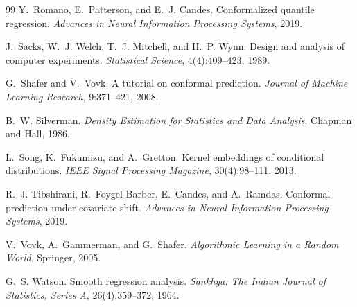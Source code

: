 \documentclass[11pt]{article}
\begin{document}
\begin{thebibliography}{99}
Y.~Romano, E.~Patterson, and E.~J. Candes.
\newblock Conformalized quantile regression.
\newblock \emph{Advances in Neural Information Processing Systems}, 2019.

J.~Sacks, W.~J. Welch, T.~J. Mitchell, and H.~P. Wynn.
\newblock Design and analysis of computer experiments.
\newblock \emph{Statistical Science}, 4(4):409--423, 1989.

G.~Shafer and V.~Vovk.
\newblock A tutorial on conformal prediction.
\newblock \emph{Journal of Machine Learning Research}, 9:371--421, 2008.

B.~W. Silverman.
\newblock \emph{Density Estimation for Statistics and Data Analysis}.
\newblock Chapman and Hall, 1986.

L.~Song, K.~Fukumizu, and A.~Gretton.
\newblock Kernel embeddings of conditional distributions.
\newblock \emph{IEEE Signal Processing Magazine}, 30(4):98--111, 2013.

R.~J. Tibshirani, R.~Foygel Barber, E.~Candes, and A.~Ramdas.
\newblock Conformal prediction under covariate shift.
\newblock \emph{Advances in Neural Information Processing Systems}, 2019.

V.~Vovk, A.~Gammerman, and G.~Shafer.
\newblock \emph{Algorithmic Learning in a Random World}.
\newblock Springer, 2005.

G.~S. Watson.
\newblock Smooth regression analysis.
\newblock \emph{Sankhy\={a}: The Indian Journal of Statistics, Series A}, 26(4):359--372, 1964.

\end{thebibliography}
\end{document}
